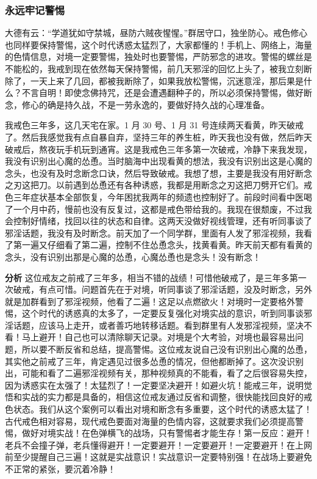 \subsubsection{永远牢记警惕}

大德有云：“学道犹如守禁城，昼防六贼夜惺惺。”群居守口，独坐防心。戒色修心也同样要保持警惕，这个时代诱惑太猛烈了，大家都懂的！手机上、网络上，海量的色情信息，对境一定要警惕，独处时也要警惕，严防邪念的进攻。警惕的螺丝是不能松的，我戒到现在依然每天保持警惕，前几天邪淫的回忆上头了，被我立刻断除了，一天上来了几回，都被我断除了，如果我放松警惕，沉迷意淫，那后果是什么？不言自明！即使念佛持咒，还是会遭遇翻种子的，所以必须保持警惕，做好断念，修心的确是持久战，不是一劳永逸的，要做好持久战的心理准备。

\begin{case}
    我戒色三年多，这几天宅在家。1 月 30 号、1 月 31 号连续两天看黄，昨天破戒了。然后我感觉我有点自暴自弃，坚持三年的养生桩，昨天我也没有做，然后昨天破戒后，熬夜玩手机玩到通宵。这是我戒色三年多第一次破戒，冷静下来我发现，我没有识别出心魔的怂恿。当时脑海中出现看黄的想法，我没有识别出这是心魔的念头，也没有及时念断念口诀，然后导致破戒。我想了想，主要是我没有用好断念之刃这把刀。以前遇到怂恿还有各种诱惑，我都是用断念之刃这把刀劈开它们。戒色三年症状基本全部恢复，今年困扰我两年的频遗也控制好了。前段时间看中医喝了一个月中药，慢前也没有反复过，这都是戒色带给我的。我现在很颓废，不过我会控制好情绪，找回以往的状态和自律。这两天没做好视线管理，还有听同事谈了邪淫话题，我没有及时断念。前天加了一个同学群，里面有人发了邪淫视频，我看了第一遍又仔细看了第二遍，控制不住怂恿念头，找黄看黄。昨天前天都有看黄的念头，没有识别出那是心魔的怂恿，心魔怂恿也是念头！没有断念！

    \textbf{分析} 这位戒友之前戒了三年多，相当不错的战绩！可惜他破戒了，是三年多第一次破戒，有点可惜。问题首先在于对境，听同事谈了邪淫话题，没及时断念，另外就是加群看到了邪淫视频，他看了二遍！这足以点燃欲火！对境时一定要格外警惕，这个时代的诱惑真的太多了，一定要反复强化对境实战的意识，听到同事谈邪淫话题，应该马上走开，或者善巧地转移话题。看到群里有人发邪淫视频，坚决不看！马上避开！自己也可以清除聊天记录。对境是个大考验，对境也最容易出问题，所以要不断反省和总结，提高警惕。这位戒友说自己没有识别出心魔的怂恿，其实他之前戒了三年，肯定遇见过很多怂恿的情况，但他都断掉了。这次没识别出，可能和看了二遍邪淫视频有关，那种视频真的不能看，看了之后很容易失控，因为诱惑实在太强了！太猛烈了！一定要坚决避开！如避火坑！能戒三年，说明觉悟和实战的实力都是具备的，相信这位戒友通过反省和调整，很快能找回良好的戒色状态。我们从这个案例可以看出对境和断念有多重要，这个时代的诱惑太猛了！古代戒色相对容易，现代戒色要面对海量的色情内容，这就要求我们必须提高警惕，做好对境实战！在色弹横飞的战场，只有警惕者才能生存！第一反应：避开！老兵不会撞子弹，老兵懂得避开！一定要避开！一定要避开！一定要避开！在上网前至少提醒自己三遍！这就是实战意识！实战意识一定要特别强！在战场上要避免不正常的紧张，要沉着冷静！
\end{case}

